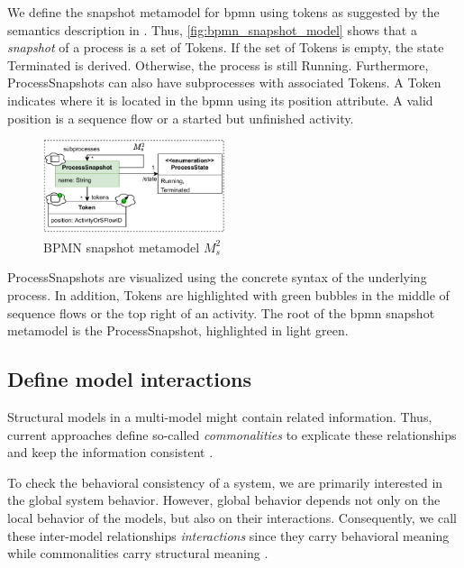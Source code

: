 \documentclass{jot}
\begin{document}
We define the snapshot metamodel for \gls*{bpmn} using tokens as suggested by the semantics description in \cite{objectmanagementgroupBusinessProcessModel2013}.
Thus, \autoref{fig:bpmn_snapshot_model} shows that a \emph{snapshot} of a process is a set of \textsf{Token}s.
If the set of \textsf{Token}s is empty, the state \textsf{Terminated} is derived.
Otherwise, the process is still \textsf{Running}.
Furthermore, \textsf{ProcessSnapshot}s can also have \textsf{subprocesses} with associated \textsf{Token}s.
A \textsf{Token} indicates where it is located in the \gls*{bpmn} using its \textsf{position} attribute.
A valid \textsf{position} is a sequence flow or a started but unfinished activity.

\begin{figure}[h]
    \centering
    \includegraphics[width=0.475\textwidth]{figures/bpmn_s_model.pdf}
    \caption{BPMN snapshot metamodel $M_s^2$}
    \label{fig:bpmn_snapshot_model}
\end{figure}

\textsf{ProcessSnapshot}s are visualized using the concrete syntax of the underlying process.
In addition, \textsf{Token}s are highlighted with green bubbles in the middle of sequence flows or the top right of an activity.
The root of the \gls*{bpmn} snapshot metamodel is the \textsf{ProcessSnapshot}, highlighted in light green.

\subsection{Define model interactions}
Structural models in a multi-model might contain related information.
Thus, current approaches define so-called \emph{commonalities} to explicate these relationships and keep the information consistent \cite{stunkelComprehensiveSystemsFormal2021,klareCommonalitiesPreservingConsistency2019}.

To check the behavioral consistency of a system, we are primarily interested in the global system behavior.
However, global behavior depends not only on the local behavior of the models, but also on their interactions.
Consequently, we call these inter-model relationships \emph{interactions} since they carry behavioral meaning while commonalities carry structural meaning \cite{krauterBehavioralConsistencyHeterogeneous2021}.
\end{document}
